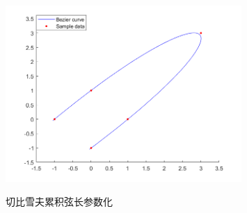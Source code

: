 \documentclass[utf8]{ctexart}
\begin{document}
\begin{itemize}
    \begin{figure}[H]
        \centering
        \includegraphics[width=0.8\textwidth]{bezierFit_2d_cheby.png}
        \label{fig5}
        \caption{切比雪夫累积弦长参数化}
    \end{figure}


\end{itemize}
\end{document}
